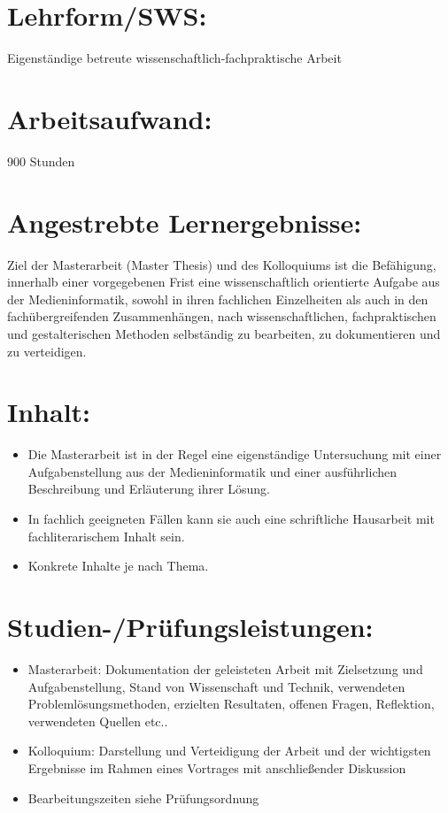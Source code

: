 \section*{Lehrform/SWS:}\label{lehrformsws-1}

Eigenständige betreute wissenschaftlich-fachpraktische Arbeit

\section*{Arbeitsaufwand:}\label{arbeitsaufwand-1}

900 Stunden

\section*{Angestrebte
Lernergebnisse:}\label{angestrebte-lernergebnisse-1}

Ziel der Masterarbeit (Master Thesis) und des Kolloquiums ist die
Befähigung, innerhalb einer vorgegebenen Frist eine wissenschaftlich
orientierte Aufgabe aus der Medieninformatik, sowohl in ihren fachlichen
Einzelheiten als auch in den fachübergreifenden Zusammenhängen, nach
wissenschaftlichen, fachpraktischen und gestalterischen Methoden
selbständig zu bearbeiten, zu dokumentieren und zu verteidigen.

\section*{Inhalt:}\label{inhalt-1}

\begin{itemize}
\item
  Die Masterarbeit ist in der Regel eine eigenständige Untersuchung mit
  einer Aufgabenstellung aus der Medieninformatik und einer
  ausführlichen Beschreibung und Erläuterung ihrer Lösung.
\item
  In fachlich geeigneten Fällen kann sie auch eine schriftliche
  Hausarbeit mit fachliterarischem Inhalt sein.
\item
  Konkrete Inhalte je nach Thema.
\end{itemize}

\section*{Studien-/Prüfungsleistungen:}\label{studien-pruxfcfungsleistungen-1}

\begin{itemize}
\item
  Masterarbeit: Dokumentation der geleisteten Arbeit mit Zielsetzung und
  Aufgabenstellung, Stand von Wissenschaft und Technik, verwendeten
  Problemlösungsmethoden, erzielten Resultaten, offenen Fragen,
  Reflektion, verwendeten Quellen etc..
\item
  Kolloquium: Darstellung und Verteidigung der Arbeit und der
  wichtigsten Ergebnisse im Rahmen eines Vortrages mit anschließender
  Diskussion
\item
  Bearbeitungszeiten siehe Prüfungsordnung
\end{itemize}

